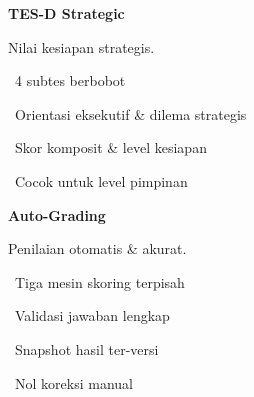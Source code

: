\documentclass[a4paper]{article}
\begin{document}
\vspace{8pt}

\noindent
\begin{minipage}[t]{0.485\textwidth}
    \colorbox{PurplePrimary}{%
        \begin{minipage}{\dimexpr\textwidth-2\fboxsep\relax}
            {\fontsize{10}{13}\selectfont\bfseries\color{White} TES-D Strategic}
        \end{minipage}}\par
    \vspace{4pt}
    {\fontsize{9}{12}\selectfont\color{TextDark}%
    Nilai kesiapan strategis.\par\vspace{3pt}
    \textbullet\ 4 subtes berbobot\par\vspace{2pt}%
    \textbullet\ Orientasi eksekutif \& dilema strategis\par\vspace{2pt}%
    \textbullet\ Skor komposit \& level kesiapan\par\vspace{2pt}%
    \textbullet\ Cocok untuk level pimpinan}%

\end{minipage}%
\hfill
\begin{minipage}[t]{0.485\textwidth}
    \colorbox{BlueDark}{%
        \begin{minipage}{\dimexpr\textwidth-2\fboxsep\relax}
            {\fontsize{10}{13}\selectfont\bfseries\color{White} Auto-Grading}
        \end{minipage}}\par
    \vspace{4pt}
    {\fontsize{9}{12}\selectfont\color{TextDark}%
    Penilaian otomatis \& akurat.\par\vspace{3pt}
    \textbullet\ Tiga mesin skoring terpisah\par\vspace{2pt}%
    \textbullet\ Validasi jawaban lengkap\par\vspace{2pt}%
    \textbullet\ Snapshot hasil ter-versi\par\vspace{2pt}%
    \textbullet\ Nol koreksi manual}%

\end{minipage}

\vspace{8pt}
\end{document}
